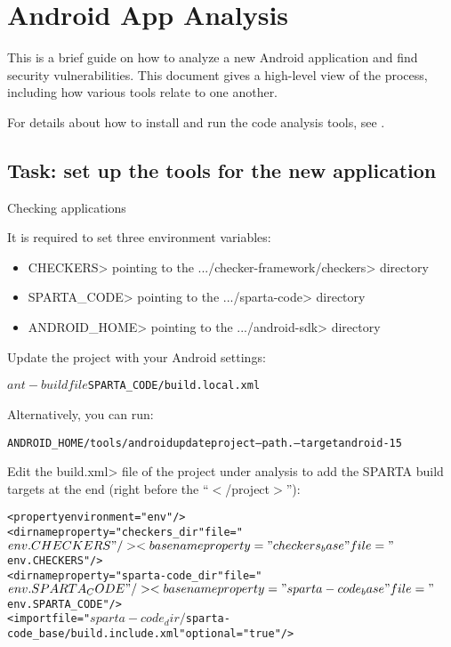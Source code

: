 \htmlhr
\chapter{Android App Analysis\label{appanalysis}}

This is a brief guide on how to analyze a new Android application and
find security vulnerabilities. This document gives a high-level view
of the process, including how various tools relate to one another.

For details about how to install and run the code analysis tools, see .


\section{Task:  set up the tools for the new application}

Checking applications

It is required to set three environment variables:

\begin{itemize}
\item
\<CHECKERS> pointing to the
\<.../checker-framework/checkers> directory

\item
\<SPARTA\_CODE> pointing to the \<.../sparta-code> directory

\item
\<ANDROID\_HOME> pointing to the \<.../android-sdk> directory

\end{itemize}


Update the project with your Android settings:

\begin{alltt}
$ ant -buildfile $SPARTA_CODE/build.local.xml
\end{alltt}

Alternatively, you can run:

\begin{alltt}
$ $ANDROID_HOME/tools/android update project --path . --target android-15
\end{alltt}

Edit the \<build.xml> file of the project under analysis to add the
SPARTA build targets at the end (right before the ``$<$/project$>$''):

\begin{alltt}
<property environment="env"/>
<dirname property="checkers_dir" file="${env.CHECKERS}"/>
<basename property="checkers_base" file="${env.CHECKERS}"/>
<dirname property="sparta-code_dir" file="${env.SPARTA_CODE}"/>
<basename property="sparta-code_base" file="${env.SPARTA_CODE}"/>
<import file="${sparta-code_dir}/${sparta-code_base}/build.include.xml" optional="true"/>
\end{alltt}



